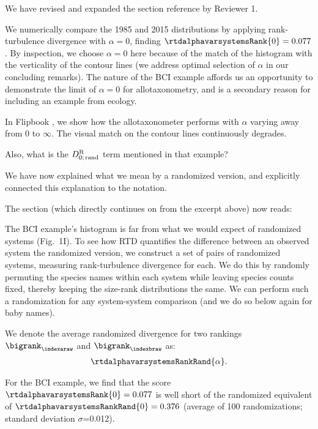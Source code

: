 We have revised and expanded the section reference by Reviewer 1.

\begin{excerpt}
  We numerically compare the 1985 and 2015 distributions by applying
  rank-turbulence divergence with $\alpha = 0$,
  finding $\rtdalphavarsystemsRank{0} = 0.077$.
  By inspection, we choose $\alpha=0$ here
  because of the match of the histogram
  with the verticality of the contour lines
  (we address optimal selection of $\alpha$ in our concluding remarks).
  The nature of the BCI example affords us an opportunity to
  demonstrate the limit of $\alpha=0$ for allotaxonometry,
  and is a secondary reason for including an example from ecology.

  In Flipbook \flipbooktrees, we show how the allotaxonometer
  performs with $\alpha$ varying away from 0 to $\infty$.
  The visual match on the contour lines continuously degrades.
\end{excerpt}

\begin{reviewercomment}
  Also, what is the $D_{0;\,\textnormal{rand}}^{\textnormal{R}}$ term
  mentioned in that example?
\end{reviewercomment}

We have now explained what we mean by a randomized version,
and explicitly connected this explanation to the notation.

The section (which directly continues on from the excerpt above)
now reads:
\begin{excerpt}
  The BCI example's histogram is far 
  from what we would expect of randomized systems
  (Fig.~1I).
  To see how RTD quantifies the difference between an observed system the randomized version,
  we construct a set of pairs of randomized systems,
  measuring rank-turbulence divergence for each.
  We do this by randomly permuting the species names within each system
  while leaving species counts fixed,
  thereby keeping the size-rank distributions the same.
  We can perform such a randomization for any system-system comparison
  (and we do so below again for baby names).

  We denote the average randomized divergence for two rankings 
  $\bigrank_{\indexaraw}$
  and
  $\bigrank_{\indexbraw}$
  as:
  \begin{gather}
    \rtdalphavarsystemsRankRand{\alpha}.
    \label{eq:rankturbdiv.randomizeddivergence}
  \end{gather}

  For the BCI example, we find that the score
  $\rtdalphavarsystemsRank{0} = 0.077$
  is well short of the randomized equivalent
  of
  $\rtdalphavarsystemsRankRand{0} = 0.376$
  (average of 100 randomizations; standard deviation $\sigma$=0.012).
\end{excerpt}

